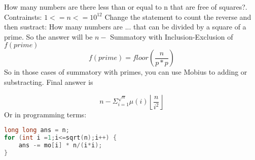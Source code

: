 How many numbers are there less than or equal to n that are free of squares?. Contrainsts: $1 <= n <= 10^{12}$
\newline\newline
Change the statement to count the reverse and then sustract: How many numbers are ... that can be divided by a square of a prime. So the answer will be $n -$ Summatory with Inclusion-Exclusion of $f(prime)$
\newline
$$ f(prime) = floor(\frac{n}{p*p}) $$
\newline
So in those cases of summatory with primes, you can use Mobius to adding or substracting. Final answer is

$$ n - \Sigma^{\sqrt{n}}_{i=1} \mu(i)\left\lfloor \frac{n}{i^2} \right\rfloor $$ 
\newline
Or in programming terms:

\begin{lstlisting}[language=C++, frame=None]
long long ans = n;
for (int i =1;i<=sqrt(n);i++) {
    ans -= mo[i] * n/(i*i);
}
\end{lstlisting}


